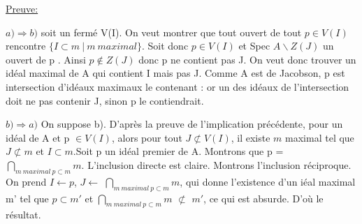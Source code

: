 \documentclass[10pt, twoside]{article}
\theoremstyle{plain}
\theoremstyle{definition}
\theoremstyle{plain}
\theoremstyle{plain}
\theoremstyle{definition}
\theoremstyle{remark}
\begin{document}
\underline{Preuve:}
\\ 
\item[•] $ a) \Rightarrow b) $ soit un fermé V(I). On veut montrer que tout ouvert de tout $p \in V(I)$ rencontre $ \{I \subset m \ | \ m \ maximal \} $. Soit donc $p \in V(I)$ et Spec $A  \backslash Z(J) $ un ouvert de p . Ainsi $p \notin Z(J)$ donc p ne contient pas J. On veut donc trouver un idéal maximal de A qui contient I mais pas J. Comme A est de Jacobson, p est intersection d’idéaux maximaux le contenant : or un des idéaux de l’intersection doit ne pas contenir J, sinon p
le contiendrait. 
\\
\item[•] $ b) \Rightarrow a) $ On suppose b). D'après la preuve de l'implication précédente, pour un idéal de A et p $\in V(I)$, alors pour tout $J \not\subset V(I) $, il existe $m$ maximal tel que $J \not\subset m$ et $I \subset m$.Soit p un idéal premier de A. Montrons que p = $\bigcap_{m  \ maximal \ p \subset m}^{} m $. L'inclusion directe est claire. Montrons l'inclusion réciproque. On prend $I \leftarrow p$, $J  \leftarrow$ $\bigcap_{m  \ maximal \ p \subset m}^{} m $, qui donne l'existence d'un iéal maximal m' tel que  $p \subset m'$ et $\bigcap_{m  \ maximal \ p \subset m}^{} m $ $\not\subset$ $m'$, ce qui est absurde. D'où le résultat.

\newpage
\printbibliography[
heading=bibintoc,
title={Références}
]
\end{document}
